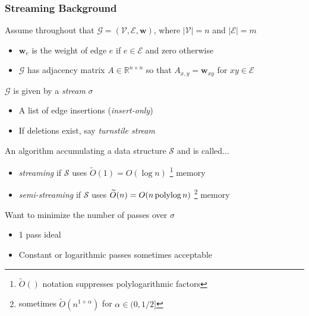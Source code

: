 \documentclass{beamer}
\newcommand{\polylog}{\, \textnormal{polylog} \,}
\begin{document}

\begin{frame}
\frametitle{Streaming Background}

Assume throughout that $\mathcal{G}=(\mathcal{V}, \mathcal{E}, \mathbf{w})$, where $|\mathcal{V}| = n$ and $|\mathcal{E}| = m$

\begin{itemize}
	\item $\mathbf{w}_e$ is the weight of edge $e$ if $e \in \mathcal{E}$ and zero otherwise
	\item $\mathcal{G}$ has adjacency matrix $A \in \mathbb{R}^{n \times n}$ so that $A_{x,y} = \textbf{w}_{xy}$ for $xy \in \mathcal{E}$
\end{itemize}

$\mathcal{G}$ is given by a \emph{stream} $\sigma$
\begin{itemize}
	\item A list of edge insertions (\emph{insert-only})
	\item If deletions exist, say \emph{turnstile stream}
\end{itemize}

An algorithm accumulating a data structure $\mathcal{S}$ and is called...
\begin{itemize}
	\item \emph{streaming} if $\mathcal{S}$ uses $\widetilde{O}(1) = O(\log n)$
	\footnote{\scriptsize $\widetilde{O}()$ notation suppresses polylogarithmic factors} memory
	\item \emph{semi-streaming} if $\mathcal{S}$ uses $\widetilde{O}(n) = O(n \polylog n)$
	\footnote{\scriptsize sometimes $\widetilde{O} \left (n^{1+\alpha} \right )$ for $\alpha \in (0,1/2]$} memory
\end{itemize}

Want to minimize the number of passes over $\sigma$	
\begin{itemize}
	\item 1 pass ideal
	\item Constant or logarithmic passes sometimes acceptable 
\end{itemize}

\end{frame}

\end{document}
